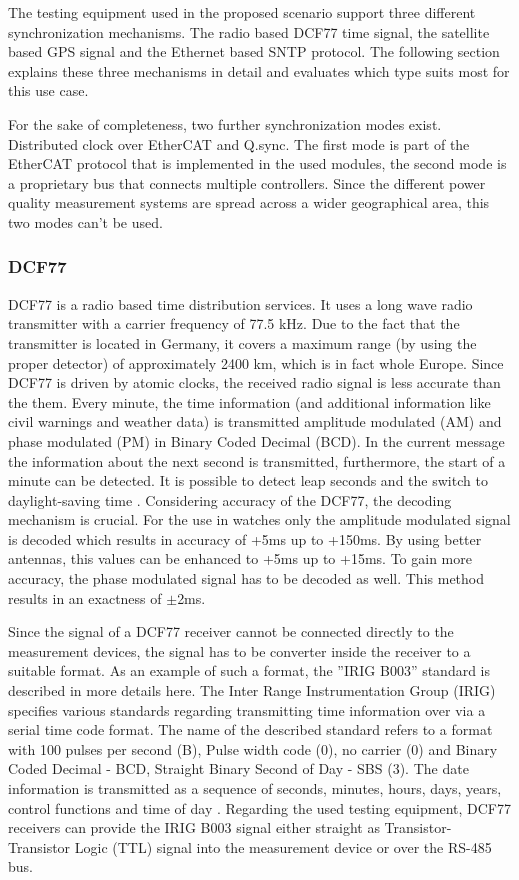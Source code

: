 The testing equipment used in the proposed scenario support three different synchronization mechanisms. The radio based DCF77 time signal, the satellite based GPS signal and the Ethernet based SNTP protocol. The following section explains these three mechanisms in detail and evaluates which type suits most for this use case.

For the sake of completeness, two further synchronization modes exist. Distributed clock over EtherCAT and Q.sync. The first mode is part of the EtherCAT protocol that is implemented in the used modules, the second mode is a proprietary bus that connects multiple controllers. Since the different power quality measurement systems are spread across a wider geographical area, this two modes can't be used.

\subsubsection{DCF77}
DCF77 is a radio based time distribution services. It uses a long wave radio transmitter with a carrier frequency of 77.5 kHz. Due to the fact that the transmitter is located in Germany, it covers a maximum range (by using the proper detector) of approximately 2400 km, which is in fact whole Europe. Since DCF77 is driven by atomic clocks, the received radio signal is less accurate than the them\cite{dcf77}. Every minute, the time information (and additional information like civil warnings\cite{dcf77_2} and weather data\cite{dcf77}) is transmitted amplitude modulated (AM) and phase modulated (PM) in Binary Coded Decimal (BCD). In the current message the information about the next second is transmitted, furthermore, the start of a minute can be detected. It is possible to detect leap seconds and the switch to daylight-saving time \cite{dcf77_2}. Considering accuracy of the DCF77, the decoding mechanism is crucial. For the use in watches only the amplitude modulated signal is decoded which results in accuracy of +5ms up to +150ms. By using better antennas, this values can be enhanced to +5ms up to +15ms. To gain more accuracy, the phase modulated signal has to be decoded as well. This method results in an exactness of $\pm$2ms\cite{dcf77_3}.

Since the signal of a DCF77 receiver cannot be connected directly to the measurement devices, the signal has to be converter inside the receiver to a suitable format. As an example of such a format, the ''IRIG B003'' standard is described in more details here. The Inter Range Instrumentation Group (IRIG) specifies various standards regarding transmitting time information over via a serial time code format. The name of the described standard refers to a format with 100 pulses per second (B), Pulse width code (0), no carrier (0) and Binary Coded Decimal - BCD, Straight Binary Second of Day - SBS (3). The date information is transmitted as a sequence of seconds, minutes, hours, days, years, control functions and time of day \cite{irig}. Regarding the used testing equipment, DCF77 receivers can provide the IRIG B003 signal either straight as Transistor-Transistor Logic (TTL) signal into the measurement device or over the RS-485 bus.

